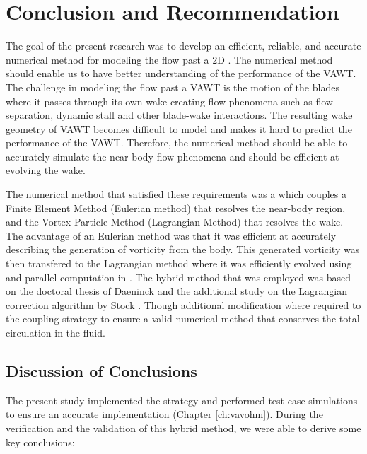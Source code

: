 \chapter{Conclusion and Recommendation}
\label{ch:ConclusionandRecommendation}

The goal of the present research was to develop an efficient, reliable, and accurate numerical method for modeling the flow past a 2D . The numerical method should enable us to have better understanding of the performance of the VAWT. The challenge in modeling the flow past a VAWT is the motion of the blades where it passes through its own wake creating flow phenomena such as flow separation, dynamic stall and other blade-wake interactions. The resulting wake geometry of VAWT becomes difficult to model and makes it hard to predict the performance of the VAWT. Therefore, the numerical method should be able to accurately simulate the near-body flow phenomena and should be efficient at evolving the wake.

The numerical method that satisfied these requirements was a  which couples a Finite Element Method (Eulerian method) that resolves the near-body region, and the Vortex Particle Method (Lagrangian Method) that resolves the wake. The advantage of an Eulerian method was that it was efficient at accurately describing the generation of vorticity from the body. This generated vorticity was then transfered to the Lagrangian method where it was efficiently evolved using  and parallel computation in . The hybrid method that was employed was based on the doctoral thesis of Daeninck \cite{Daeninck2006} and the additional study on the Lagrangian correction algorithm by Stock \cite{Stock2010a}. Though additional modification where required to the coupling strategy to ensure a valid numerical method that conserves the total circulation in the fluid.


\section{Discussion of Conclusions}

The present study implemented the strategy and performed test case simulations to ensure an accurate implementation (Chapter \ref{ch:vavohm}). During the verification and the validation of this hybrid method, we were able to derive some key conclusions:

